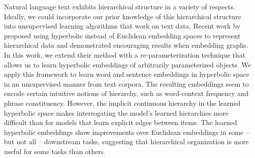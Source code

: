 Natural language text exhibits hierarchical structure in a variety of respects. Ideally, we could incorporate our prior knowledge of this hierarchical structure into unsupervised learning algorithms that work on text data. Recent work by \citet{nickel2017poincar} proposed using hyperbolic instead of Euclidean embedding spaces to represent hierarchical data and demonstrated encouraging results when embedding graphs. In this work, we extend their method with a re-parameterization technique that allows us to learn hyperbolic embeddings of arbitrarily parameterized objects. We apply this framework to learn word and sentence embeddings in hyperbolic space in an unsupervised manner from text corpora. The resulting embeddings seem to encode certain intuitive notions of hierarchy, such as word-context frequency and phrase constituency. However, the implicit continuous hierarchy in the learned hyperbolic space makes interrogating the model's learned hierarchies more difficult than for models that learn explicit edges between items. The learned hyperbolic embeddings show improvements over Euclidean embeddings in some -- but not all -- downstream tasks, suggesting that hierarchical organization is more useful for some tasks than others.
